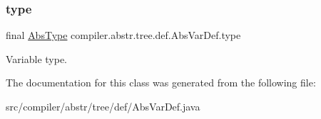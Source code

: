 \subsubsection{\texorpdfstring{type}{type}}
{\footnotesize\ttfamily final \hyperlink{classcompiler_1_1abstr_1_1tree_1_1type_1_1_abs_type}{Abs\+Type} compiler.\+abstr.\+tree.\+def.\+Abs\+Var\+Def.\+type}

Variable type. 

The documentation for this class was generated from the following file\+:\begin{DoxyCompactItemize}
\item 
src/compiler/abstr/tree/def/Abs\+Var\+Def.\+java\end{DoxyCompactItemize}
